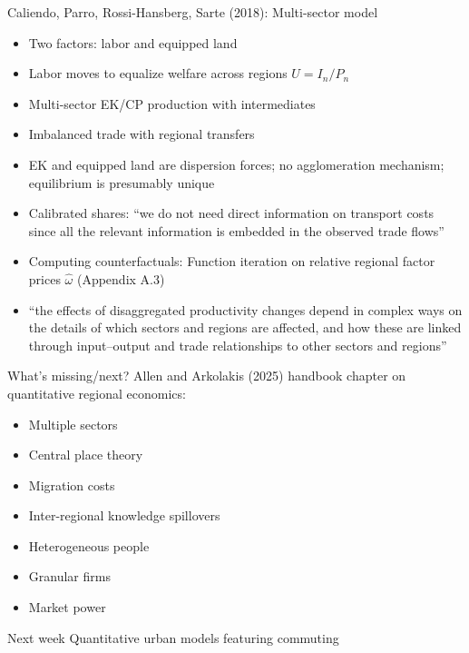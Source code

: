\documentclass[11pt,notes=hide,aspectratio=169]{beamer}
\begin{document}
\begin{frame}{Caliendo, Parro, Rossi-Hansberg, Sarte (2018): Multi-sector model}
\begin{itemize}
\item Two factors: labor and equipped land
\item Labor moves to equalize welfare across regions $U = I_n / P_n$
\item Multi-sector EK/CP production with intermediates
\item Imbalanced trade with regional transfers
\item EK and equipped land are dispersion forces; no agglomeration mechanism; equilibrium is presumably unique
\item Calibrated shares: ``we do not need direct information on transport costs since all the relevant information is embedded in the observed trade flows''
\item Computing counterfactuals: Function iteration on relative regional factor prices $\hat{\omega}$
(Appendix A.3)
\item {``the effects of disaggregated productivity changes depend in complex ways on the details of which sectors and regions are affected, and how these are linked through input–output and trade relationships to other sectors and regions''\par}
\end{itemize}
\end{frame}
\begin{frame}{What's missing/next?}
Allen and Arkolakis (2025) handbook chapter on quantitative regional economics:
\begin{itemize}
\item Multiple sectors
\item Central place theory
\item Migration costs
\item Inter-regional knowledge spillovers
\item Heterogeneous people
\item Granular firms
\item Market power
\end{itemize}
\end{frame}
\begin{frame}{Next week}
Quantitative urban models featuring commuting
\end{frame}
\end{document}
